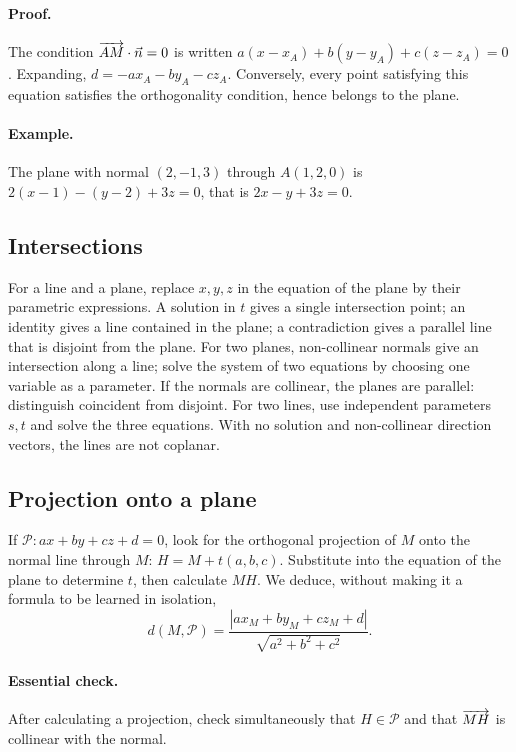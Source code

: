 \paragraph{Proof.} The condition $\overrightarrow{AM}\cdot\vec n=0$ is written $a(x-x_A)+b(y-y_A)+c(z-z_A)=0$. Expanding, $d=-ax_A-by_A-cz_A$. Conversely, every point satisfying this equation satisfies the orthogonality condition, hence belongs to the plane.
\paragraph{Example.} The plane with normal $(2,-1,3)$ through $A(1,2,0)$ is $2(x-1)-(y-2)+3z=0$, that is $2x-y+3z=0$.
\subsection{Intersections}
For a line and a plane, replace $x,y,z$ in the equation of the plane by their parametric expressions. A solution in $t$ gives a single intersection point; an identity gives a line contained in the plane; a contradiction gives a parallel line that is disjoint from the plane.
For two planes, non-collinear normals give an intersection along a line; solve the system of two equations by choosing one variable as a parameter. If the normals are collinear, the planes are parallel: distinguish coincident from disjoint.
For two lines, use independent parameters $s,t$ and solve the three equations. With no solution and non-collinear direction vectors, the lines are not coplanar.
\subsection{Projection onto a plane}
If $\mathcal P:ax+by+cz+d=0$, look for the orthogonal projection of $M$ onto the normal line through $M$: $H=M+t(a,b,c)$. Substitute into the equation of the plane to determine $t$, then calculate $MH$.
We deduce, without making it a formula to be learned in isolation,
\[d(M,\mathcal P)=\frac{|ax_M+by_M+cz_M+d|}{\sqrt{a^2+b^2+c^2}}.\]
\paragraph{Essential check.} After calculating a projection, check simultaneously that $H\in\mathcal P$ and that $\overrightarrow{MH}$ is collinear with the normal.


